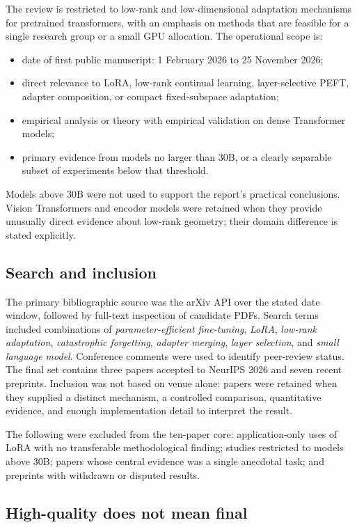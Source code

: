 \documentclass[11pt]{article}
\begin{document}
The review is restricted to low-rank and low-dimensional adaptation mechanisms for pretrained transformers, with an emphasis on methods that are feasible for a single research group or a small GPU allocation. The operational scope is:
\begin{itemize}
  \item date of first public manuscript: 1 February 2026 to 25 November 2026;
  \item direct relevance to LoRA, low-rank continual learning, layer-selective PEFT, adapter composition, or compact fixed-subspace adaptation;
  \item empirical analysis or theory with empirical validation on dense Transformer models;
  \item primary evidence from models no larger than 30B, or a clearly separable subset of experiments below that threshold.
\end{itemize}

Models above 30B were not used to support the report's practical conclusions. Vision Transformers and encoder models were retained when they provide unusually direct evidence about low-rank geometry; their domain difference is stated explicitly.

\subsection{Search and inclusion}

The primary bibliographic source was the arXiv API over the stated date window, followed by full-text inspection of candidate PDFs. Search terms included combinations of \emph{parameter-efficient fine-tuning}, \emph{LoRA}, \emph{low-rank adaptation}, \emph{catastrophic forgetting}, \emph{adapter merging}, \emph{layer selection}, and \emph{small language model}. Conference comments were used to identify peer-review status. The final set contains three papers accepted to NeurIPS 2026 and seven recent preprints. Inclusion was not based on venue alone: papers were retained when they supplied a distinct mechanism, a controlled comparison, quantitative evidence, and enough implementation detail to interpret the result.

The following were excluded from the ten-paper core: application-only uses of LoRA with no transferable methodological finding; studies restricted to models above 30B; papers whose central evidence was a single anecdotal task; and preprints with withdrawn or disputed results.

\subsection{High-quality does not mean final}
\end{document}
